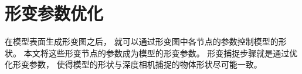 \section{形变参数优化}
在模型表面生成形变图之后，
就可以通过形变图中各节点的参数控制模型的形状。
本文将这些形变节点的参数成为模型的形变参数。
形变捕捉步骤就是通过优化形变参数，
使得模型的形状与深度相机捕捉的物体形状尽可能一致。
